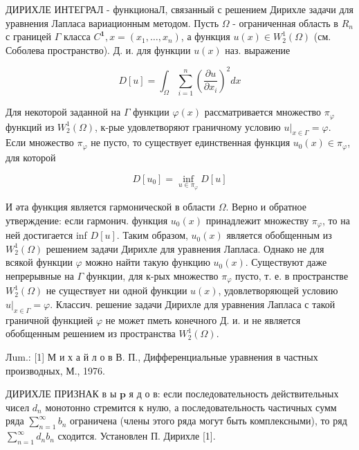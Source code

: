 \documentclass[10pt]{article}
\begin{document}
ДИРИХЛЕ ИНТЕГРАЛ - функционаЛ, связанный с решением Дирихле задачи для уравнения Лапласа вариационным методом. Пусть $\Omega$ - ограниченная область в $R_{n}$ с границей $\Gamma$ класса $C^{\mathbf{1}}, x=\left(x_{1}, \ldots, x_{n}\right)$, а функция $u(x) \in W_{2}^{1}(\Omega)$ (см. Соболева пространство). Д. и. для функции $u(x)$ наз. выражение



\[

D[u]=\int_{\Omega} \sum_{i=1}^{n}\left(\frac{\partial u}{\partial x_{i}}\right)^{2} d x

\]



Для некоторой заданной на $\Gamma$ функции $\varphi(x)$ рассматривается множество $\pi_{\varphi}$ функций из $W_{2}^{1}(\Omega)$, к-рые удовлетворяют граничному условию $\left.u\right|_{x \in \Gamma}=\varphi$. Если множество $\pi_{\varphi}$ не пусто, то существует единственная функция $u_{0}(x) \in \pi_{\varphi}$, для которой



\[

D\left[u_{0}\right]=\inf _{u \in \pi_{\varphi}} D[u]

\]



И әта функция является гармонической в области $\Omega$. Верно и обратное утверждение: если гармонич. функция $u_{0}(x)$ принадлежит множеству $\pi_{\varphi}$, то на ней достигается inf $D[u]$. Таким образом, $u_{0}(x)$ является обобщенным из $W_{2}^{1}(\Omega)$ решением задачи Дирихле для уравнения Лапласа. Однако не для всякой функции $\varphi$ можно найти такую функцию $u_{0}(x)$. Существуют даже непрерывные на $\Gamma$ функции, для к-рых множество $\pi_{\varphi}$ пусто, т. е. в пространстве $W_{2}^{1}(\Omega)$ не существует ни одной функции $u(x)$, удовлетворяющей условию $\left.u\right|_{x \in \Gamma}=\varphi$. Классич. решение задачи Дирихле для уравнения Лапласа с такой граничной функцией $\varphi$ не может пметь конечного Д. и. и не является обобщенным решением из пространства $W_{2}^{1}(\Omega)$.



Лum.: [1] М и х а й л о в В. П., Дифференциальные уравнения в частных производных, М., 1976.



ДИРИХЛЕ ПРИЗНАК в ы $\mathbf{p}$ я д о в: если последовательность действительных чисел $d_{n}$ монотонно стремится к нулю, а последовательность частичных сумм ряда $\sum_{n=1}^{\infty} b_{n}$ ограничена (члены этого ряда могут быть комплексными), то ряд $\sum_{n=1}^{\infty} d_{n} b_{n}$ сходится. Установлен П. Дирихле [1].
\end{document}
